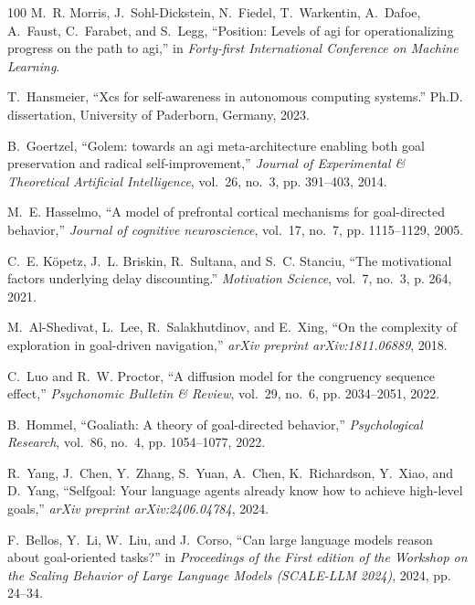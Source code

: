 \documentclass[10pt,journal,compsoc]{IEEEtran}
\begin{document}
\begin{thebibliography}{100}
	M.~R. Morris, J.~Sohl-Dickstein, N.~Fiedel, T.~Warkentin, A.~Dafoe, A.~Faust,
	C.~Farabet, and S.~Legg, ``Position: Levels of agi for operationalizing
	progress on the path to agi,'' in \emph{Forty-first International Conference
		on Machine Learning}.
	
	T.~Hansmeier, ``Xcs for self-awareness in autonomous computing systems.'' Ph.D.
	dissertation, University of Paderborn, Germany, 2023.
	
	B.~Goertzel, ``Golem: towards an agi meta-architecture enabling both goal
	preservation and radical self-improvement,'' \emph{Journal of Experimental \&
		Theoretical Artificial Intelligence}, vol.~26, no.~3, pp. 391--403, 2014.
	
	M.~E. Hasselmo, ``A model of prefrontal cortical mechanisms for goal-directed
	behavior,'' \emph{Journal of cognitive neuroscience}, vol.~17, no.~7, pp.
	1115--1129, 2005.
	
	C.~E. K{\"o}petz, J.~L. Briskin, R.~Sultana, and S.~C. Stanciu, ``The
	motivational factors underlying delay discounting.'' \emph{Motivation
		Science}, vol.~7, no.~3, p. 264, 2021.
	
	M.~Al-Shedivat, L.~Lee, R.~Salakhutdinov, and E.~Xing, ``On the complexity of
	exploration in goal-driven navigation,'' \emph{arXiv preprint
		arXiv:1811.06889}, 2018.
	
	C.~Luo and R.~W. Proctor, ``A diffusion model for the congruency sequence
	effect,'' \emph{Psychonomic Bulletin \& Review}, vol.~29, no.~6, pp.
	2034--2051, 2022.
	
	B.~Hommel, ``Goaliath: A theory of goal-directed behavior,''
	\emph{Psychological Research}, vol.~86, no.~4, pp. 1054--1077, 2022.
	
	R.~Yang, J.~Chen, Y.~Zhang, S.~Yuan, A.~Chen, K.~Richardson, Y.~Xiao, and
	D.~Yang, ``Selfgoal: Your language agents already know how to achieve
	high-level goals,'' \emph{arXiv preprint arXiv:2406.04784}, 2024.
	
	F.~Bellos, Y.~Li, W.~Liu, and J.~Corso, ``Can large language models reason
	about goal-oriented tasks?'' in \emph{Proceedings of the First edition of the
		Workshop on the Scaling Behavior of Large Language Models (SCALE-LLM 2024)},
	2024, pp. 24--34.
	

\end{thebibliography}
\end{document}
